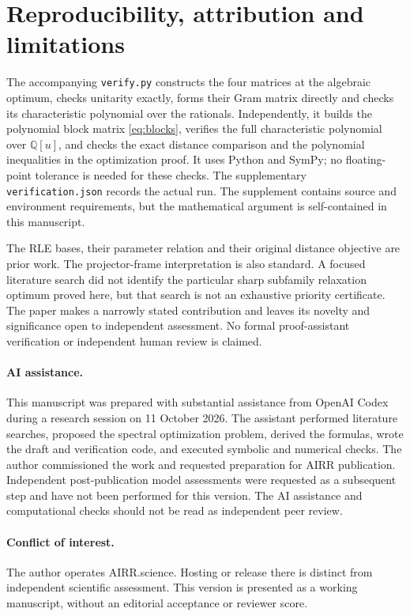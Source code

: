 \documentclass[11pt,a4paper]{article}
\theoremstyle{remark}
\begin{document}
\section{Reproducibility, attribution and limitations}
The accompanying \texttt{verify.py} constructs the four matrices at the algebraic optimum, checks unitarity exactly, forms their Gram matrix directly and checks its characteristic polynomial over the rationals. Independently, it builds the polynomial block matrix \eqref{eq:blocks}, verifies the full characteristic polynomial over $\mathbb Q[u]$, and checks the exact distance comparison and the polynomial inequalities in the optimization proof. It uses Python and SymPy; no floating-point tolerance is needed for these checks. The supplementary \texttt{verification.json} records the actual run. The supplement contains source and environment requirements, but the mathematical argument is self-contained in this manuscript.

The RLE bases, their parameter relation and their original distance objective are prior work. The projector-frame interpretation is also standard. A focused literature search did not identify the particular sharp subfamily relaxation optimum proved here, but that search is not an exhaustive priority certificate. The paper makes a narrowly stated contribution and leaves its novelty and significance open to independent assessment. No formal proof-assistant verification or independent human review is claimed.

\paragraph{AI assistance.}
This manuscript was prepared with substantial assistance from OpenAI Codex during a research session on 11 October 2026. The assistant performed literature searches, proposed the spectral optimization problem, derived the formulas, wrote the draft and verification code, and executed symbolic and numerical checks. The author commissioned the work and requested preparation for AIRR publication. Independent post-publication model assessments were requested as a subsequent step and have not been performed for this version. The AI assistance and computational checks should not be read as independent peer review.

\paragraph{Conflict of interest.}
The author operates AIRR.science. Hosting or release there is distinct from independent scientific assessment. This version is presented as a working manuscript, without an editorial acceptance or reviewer score.
\end{document}
